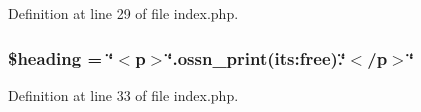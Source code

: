 Definition at line 29 of file index.\+php.

\subsubsection[{\texorpdfstring{\$heading}{$heading}}]{\setlength{\rightskip}{0pt plus 5cm}\$heading = \char`\"{}$<$p$>$\char`\"{}.ossn\+\_\+print(\textquotesingle{}its\+:free\textquotesingle{}).\char`\"{}$<$/p$>$\char`\"{}}\hypertarget{system_2plugins_2default_2pages_2contents_2index_8php_a196169be7715d466e3310388b096598c}{}\label{system_2plugins_2default_2pages_2contents_2index_8php_a196169be7715d466e3310388b096598c}


Definition at line 33 of file index.\+php.

